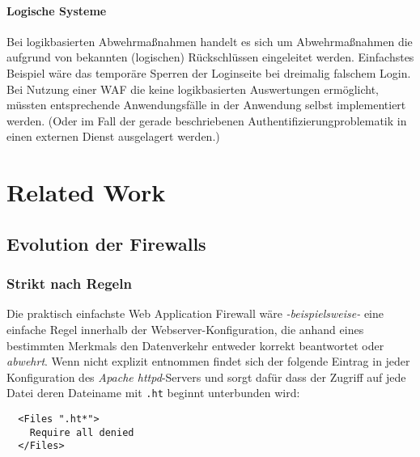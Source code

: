 \paragraph{Logische Systeme}
Bei logikbasierten Abwehrmaßnahmen handelt es sich um Abwehrmaßnahmen die aufgrund von bekannten (logischen) Rückschlüssen eingeleitet werden. Einfachstes Beispiel wäre das temporäre Sperren der Loginseite bei dreimalig falschem Login. Bei Nutzung einer WAF die keine logikbasierten Auswertungen ermöglicht, müssten entsprechende Anwendungsfälle in der Anwendung selbst implementiert werden. (Oder im Fall der gerade beschriebenen Authentifizierungproblematik in einen externen Dienst ausgelagert werden.)


\section{Related Work} %
\label{sec:relatedwork}

\subsection{Evolution der Firewalls}

\subsubsection{Strikt nach Regeln}

Die praktisch einfachste Web Application Firewall wäre \emph{-beispielsweise-} eine einfache Regel innerhalb der Webserver-Konfiguration, die anhand eines bestimmten Merkmals den Datenverkehr entweder korrekt beantwortet oder \glqq\emph{abwehrt}\grqq. Wenn nicht explizit entnommen findet sich der folgende Eintrag in jeder Konfiguration des \emph{Apache httpd}-Servers und sorgt dafür dass der Zugriff auf jede Datei deren Dateiname mit \texttt{.ht} beginnt unterbunden wird:

\begin{lstlisting}
  <Files ".ht*">
    Require all denied
  </Files>
\end{lstlisting}

